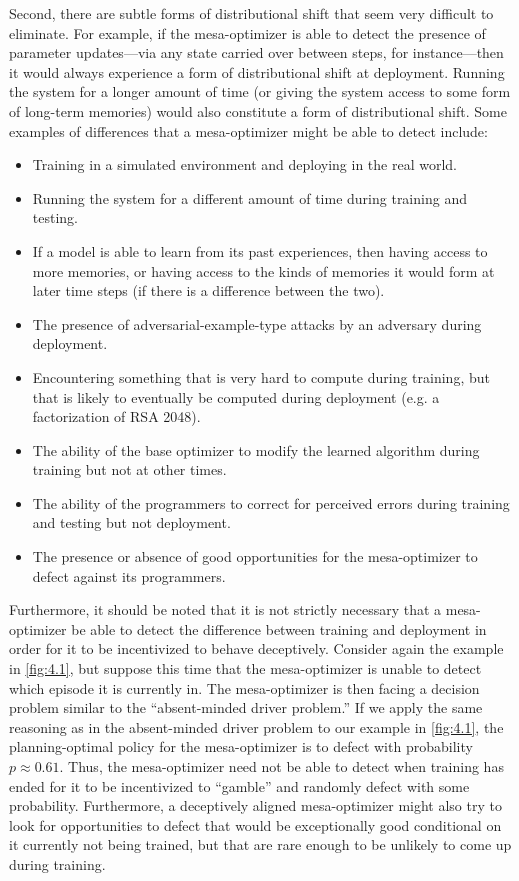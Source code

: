 \documentclass[
  onecolumn,
  natbib,
]{miri-tech-article}
\begin{document}
Second, there are subtle forms of distributional shift that seem very difficult to eliminate. For example, if the mesa-optimizer is able to detect the presence of parameter updates---via any state carried over between steps, for instance---then it would always experience a form of distributional shift at deployment. Running the system for a longer amount of time (or giving the system access to some form of long-term memories) would also constitute a form of distributional shift. Some examples of differences that a mesa-optimizer might be able to detect include:
\begin{itemize}
\item Training in a simulated environment and deploying in the real world.
\item Running the system for a different amount of time during training and testing.
\item If a model is able to learn from its past experiences, then having access to more memories, or having access to the kinds of memories it would form at later time steps (if there is a difference between the two).
\item The presence of adversarial-example-type attacks by an adversary during deployment.
\item Encountering something that is very hard to compute during training, but that is likely to eventually be computed during deployment (e.g. a factorization of RSA 2048\cite{paul_robust_corrigibility}).
\item The ability of the base optimizer to modify the learned algorithm during training but not at other times.
\item The ability of the programmers to correct for perceived errors during training and testing but not deployment.
\item The presence or absence of good opportunities for the mesa-optimizer to defect against its programmers.
\end{itemize}
Furthermore, it should be noted that it is not strictly necessary that a mesa-optimizer be able to detect the difference between training and deployment in order for it to be incentivized to behave deceptively. Consider again the example in \cref{fig:4.1}, but suppose this time that the mesa-optimizer is unable to detect which episode it is currently in. The mesa-optimizer is then facing a decision problem similar to the ``absent-minded driver problem.''\cite{absent_minded_driver} If we apply the same reasoning as in the absent-minded driver problem to our example in \cref{fig:4.1}, the planning-optimal policy for the mesa-optimizer is to defect with probability $p \approx 0.61$. Thus, the mesa-optimizer need not be able to detect when training has ended for it to be incentivized to ``gamble'' and randomly defect with some probability. Furthermore, a deceptively aligned mesa-optimizer might also try to look for opportunities to defect that would be exceptionally good conditional on it currently not being trained, but that are rare enough to be unlikely to come up during training.
\end{document}
